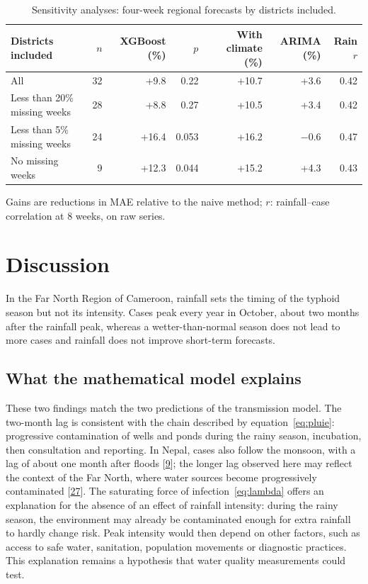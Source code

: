 \documentclass[11pt]{article}
\begin{document}
\begin{table}[!htbp]\centering\small
\caption{Sensitivity analyses: four-week regional forecasts by districts included.}\label{tab:sens}
\begin{tabularx}{\linewidth}{@{}L r r r r r r@{}}\toprule
Districts included & $n$ & XGBoost (\%) & $p$ & With climate (\%) & ARIMA (\%) & Rain $r$ \\\midrule
All & 32 & +9.8 & 0.22 & +10.7 & +3.6 & 0.42 \\
Less than 20\% missing weeks & 28 & +8.8 & 0.27 & +10.5 & +3.4 & 0.42 \\
Less than 5\% missing weeks & 24 & +16.4 & 0.053 & +16.2 & $-0.6$ & 0.47 \\
No missing weeks & 9 & +12.3 & 0.044 & +15.2 & +4.3 & 0.43 \\\bottomrule
\end{tabularx}
\par\smallskip\footnotesize\raggedright Gains are reductions in MAE relative to the naive method; $r$: rainfall–case correlation at 8 weeks, on raw series.
\end{table}

\section{Discussion}
In the Far North Region of Cameroon, rainfall sets the timing of the typhoid season but not its intensity. Cases peak every year in October, about two months after the rainfall peak, whereas a wetter-than-normal season does not lead to more cases and rainfall does not improve short-term forecasts.

\subsection{What the mathematical model explains}
These two findings match the two predictions of the transmission model. The two-month lag is consistent with the chain described by equation~\eqref{eq:pluie}: progressive contamination of wells and ponds during the rainy season, incubation, then consultation and reporting. In Nepal, cases also follow the monsoon, with a lag of about one month after floods [\hyperlink{ref9}{9}]; the longer lag observed here may reflect the context of the Far North, where water sources become progressively contaminated [\hyperlink{ref27}{27}]. The saturating force of infection~\eqref{eq:lambda} offers an explanation for the absence of an effect of rainfall intensity: during the rainy season, the environment may already be contaminated enough for extra rainfall to hardly change risk. Peak intensity would then depend on other factors, such as access to safe water, sanitation, population movements or diagnostic practices. This explanation remains a hypothesis that water quality measurements could test.
\end{document}
